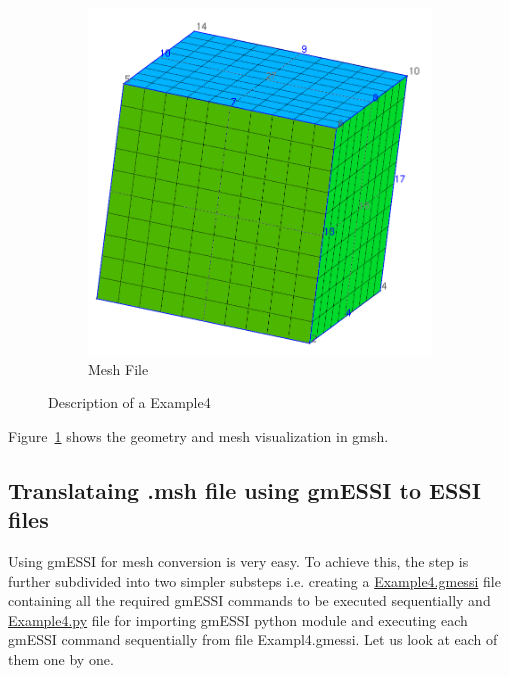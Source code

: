 \documentclass[11pt]{article}
\begin{document}
\begin{figure}[h]
  \begin{subfigure}[b]{0.3\textwidth}
    \includegraphics[width=\textwidth]
    {Images/Example4-MeshFile.png}
    \caption{Mesh File}
  \end{subfigure}

\caption{\label{Example4Mesh} Description of a Example4}
\end{figure}

Figure~\ref{Example4Mesh} shows the geometry and mesh visualization in
gmsh.

\subsection{Translataing .msh file using gmESSI to ESSI files}

Using gmESSI for mesh conversion is very easy. To achieve this, the step is
further subdivided into two simpler substeps i.e. creating a
\href{http://beta.sumeetsinha.in/gmESSI/Examples/Example4/Example4.gmessi} {
Example4.gmessi} file containing all the required gmESSI commands to be executed
sequentially and
\href{http://beta.sumeetsinha.in/gmESSI/Examples/Example4/Example4.py} {
Example4.py} file for importing gmESSI python module and executing each gmESSI
command sequentially from file Exampl4.gmessi. Let us look at each of them one
by one.
\end{document}
